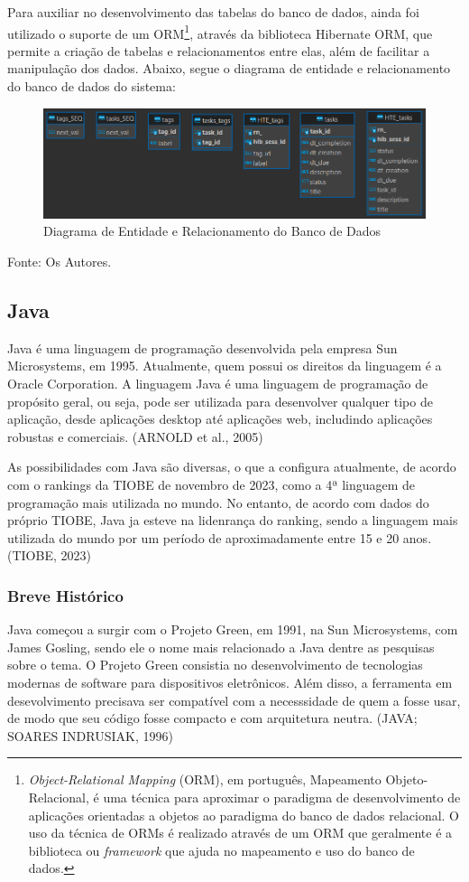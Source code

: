 \documentclass[a4paper,12pt]{article}
\begin{document}
Para auxiliar no desenvolvimento das tabelas do banco de dados, ainda foi utilizado o suporte de um ORM\footnote{
	\textit{Object-Relational Mapping} (ORM), em português, Mapeamento Objeto-Relacional, é uma técnica para aproximar o paradigma de desenvolvimento 
	de aplicações orientadas a objetos ao paradigma do banco de dados relacional. O uso da técnica de ORMs é 
	realizado através de um ORM que geralmente é a biblioteca ou \textit{framework} que ajuda no mapeamento e uso do banco de dados.
}, através da biblioteca Hibernate ORM, que permite a criação de tabelas e relacionamentos entre elas, além de facilitar a manipulação dos dados. Abaixo, segue o diagrama de entidade e relacionamento do banco de dados do sistema:
\begin{figure}[H]
	\centering
	\includegraphics[scale=0.80]{database/database-diagram.png}
	\caption{Diagrama de Entidade e Relacionamento do Banco de Dados}
\end{figure}
\noindent Fonte: Os Autores.

\subsection{Java}
Java é uma linguagem de programação desenvolvida pela empresa Sun Microsystems, em 1995. Atualmente, quem possui os direitos da 
linguagem é a Oracle Corporation. A linguagem Java é uma linguagem de programação de propósito geral, ou seja, pode ser utilizada 
para desenvolver qualquer tipo de aplicação, desde aplicações desktop até aplicações web, includindo aplicações robustas e comerciais. (ARNOLD et al., 2005)

As possibilidades com Java são diversas, o que a configura atualmente, de acordo com o rankings da TIOBE de novembro de 2023, como a 4ª linguagem de programação
mais utilizada no mundo. No entanto, de acordo com dados do próprio TIOBE, Java ja esteve na lidenrança do ranking, sendo a linguagem mais utilizada do mundo
por um período de aproximadamente entre 15 e 20 anos. (TIOBE, 2023)

\subsubsection{Breve Histórico}
Java começou a surgir com o Projeto Green, em 1991, na Sun Microsystems, com James Gosling, sendo ele o nome mais relacionado a Java dentre as pesquisas 
sobre o tema. O Projeto Green consistia no desenvolvimento de tecnologias modernas de software para dispositivos eletrônicos. Além disso, a ferramenta
em desevolvimento precisava ser compatível com a necesssidade de quem a fosse usar, de modo que seu código fosse compacto e com arquitetura neutra. (JAVA; SOARES INDRUSIAK, 1996)
\end{document}
